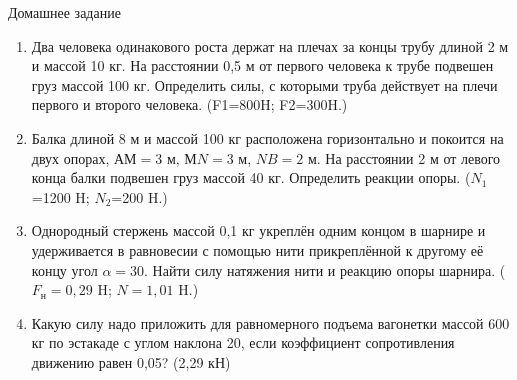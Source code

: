 \documentclass[a5paper, 10pt]{diss_4}
\renewcommand{\'}{\,'}
\begin{document}
\begin{center}
   Домашнее задание
\end{center}
\begin{enumerate}

\item Два человека одинакового роста держат на плечах за концы трубу длиной 2 м и массой 10 кг. На расстоянии 0,5 м от первого человека к трубе подвешен груз массой 100 кг. Определить силы, с которыми труба действует на плечи первого и второго человека. (F1=800H; F2=300H.)

\item Балка длиной 8 м и массой 100 кг расположена горизонтально и покоится на двух опорах, $АМ=3$ м, $МN=3$ м, $NB=2$ м. На расстоянии 2 м от левого конца балки подвешен груз массой 40 кг. Определить реакции опоры. ($N_1$=1200 H; $N_2$=200 H.)

\item Однородный стержень массой 0,1 кг укреплён одним концом в шарнире и удерживается в равновесии с помощью нити прикреплённой к другому её концу угол $\alpha=30$\textdegree. Найти силу натяжения нити и реакцию опоры шарнира. ($F_н=0,29$ H; $N=1,01$ H.)

\item Какую силу надо приложить для равномерного подъема вагонетки массой 600 кг по эстакаде с углом наклона 20\textdegree, если коэффициент сопротивления движению равен 0,05? (2,29 кН)

\end{enumerate}
\end{document}
